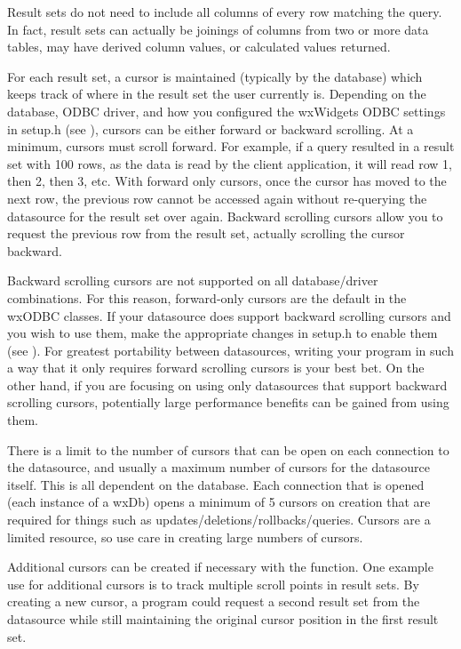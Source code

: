 Result sets do not need to include all columns of every row matching the 
query. In fact, result sets can actually be joinings of columns from two 
or more data tables, may have derived column values, or calculated values 
returned.

For each result set, a cursor is maintained (typically by the database) 
which keeps track of where in the result set the user currently is. 
Depending on the database, ODBC driver, and how you configured the 
wxWidgets ODBC settings in setup.h (see ), cursors can be 
either forward or backward scrolling. At a minimum, cursors must scroll 
forward. For example, if a query resulted in a result set with 100 rows, 
as the data is read by the client application, it will read row 1, then 2, 
then 3, etc. With forward only cursors, once the cursor has moved to 
the next row, the previous row cannot be accessed again without re-querying 
the datasource for the result set over again. Backward scrolling cursors 
allow you to request the previous row from the result set, actually 
scrolling the cursor backward.

Backward scrolling cursors are not supported on all database/driver 
combinations. For this reason, forward-only cursors are the default in 
the wxODBC classes. If your datasource does support backward scrolling 
cursors and you wish to use them, make the appropriate changes in setup.h 
to enable them (see ). For greatest portability between 
datasources, writing your program in such a way that it only requires 
forward scrolling cursors is your best bet. On the other hand, if you are 
focusing on using only datasources that support backward scrolling cursors, 
potentially large performance benefits can be gained from using them.

There is a limit to the number of cursors that can be open on each connection 
to the datasource, and usually a maximum number of cursors for the datasource 
itself. This is all dependent on the database. Each connection that is 
opened (each instance of a wxDb) opens a minimum of 5 cursors on creation 
that are required for things such as updates/deletions/rollbacks/queries. 
Cursors are a limited resource, so use care in creating large numbers of 
cursors.

Additional cursors can be created if necessary with the 
 function. One example 
use for additional cursors is to track multiple scroll points in result 
sets. By creating a new cursor, a program could request a second result set 
from the datasource while still maintaining the original cursor position in 
the first result set.

